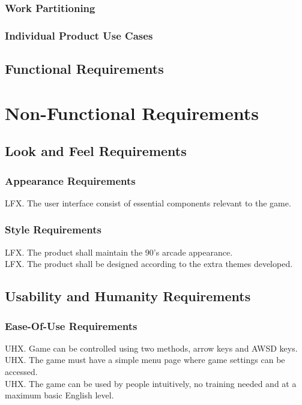 \documentclass{article}
\begin{document}
\subsubsection{Work Partitioning}


\subsubsection{Individual Product Use Cases}

\subsection{Functional Requirements}




\section{Non-Functional Requirements}
    \subsection{Look and Feel Requirements}
        \subsubsection{Appearance Requirements}
        LFX. The user interface consist of essential components relevant to the game.
        \subsubsection{Style Requirements} 
    	LFX. The product shall maintain the 90's arcade appearance.\\
    	LFX. The product shall be designed according to the extra themes developed.
   
\subsection{Usability and Humanity Requirements}
    \subsubsection{Ease-Of-Use Requirements}
    UHX. Game can be controlled using two methods, arrow keys and AWSD keys.\\
    UHX. The game must have a simple menu page where game settings can be accessed.\\
    UHX. The game can be used by people intuitively, no training needed and at a maximum basic English level.
    
\end{document}
